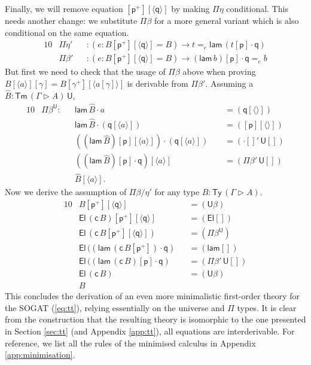 \documentclass[sigplan,10pt,anonymous,review]{acmart}\settopmatter{printfolios=true,printccs=false,printacmref=false}
\newcommand{\ra}{\rightarrow}
\newcommand{\Ty}{\mathsf{Ty}}
\newcommand{\Tm}{\mathsf{Tm}}
\newcommand{\p}{\mathsf{p}}
\newcommand{\q}{\mathsf{q}}
\newcommand{\ext}{\mathop{\triangleright}}
\newcommand{\lam}{\mathsf{lam}}
\newcommand{\U}{\mathsf{U}}
\newcommand{\El}{\mathsf{El}}
\newcommand{\cd}{\mathsf{c}}
\begin{document}
Finally, we will remove equation $[\p^+][\langle\q\rangle]$ by making
$\Pi\eta$ conditional. This needs another change: we substitute
$\Pi\beta$ for a more general variant which is also conditional on the
same equation.
\begin{alignat*}{10}
  & \Pi\eta' && : (e:B[\p^+][\langle\q\rangle] = B)\ra t =_e \lam\,(t[\p]\cdot\q) \\
  & \Pi\beta' && : (e:B[\p^+][\langle\q\rangle] = B)\ra (\lam\,b)[\p]\cdot\q =_e b
\end{alignat*}
But first we need to check that the usage of $\Pi\beta$ above when
proving $B[\langle a\rangle][\gamma] = B[\gamma^+][\langle
  a[\gamma]\rangle]$ is derivable from $\Pi\beta'$. Assuming a
$\hat{B} : \Tm\,(\Gamma\ext A)\,\U$,
\begin{alignat*}{10}
  & \Pi\beta^\U :{} &&  \lam\,\hat{B}\cdot a && {=}(\q[\langle\rangle]) \\
  & && \lam\,\hat{B}\cdot(\q[\langle a\rangle])\,\, && {=}([\p][\langle\rangle]) \\
  & && ((\lam\,\hat{B})[\p][\langle a\rangle])\cdot(\q[\langle a\rangle])\,\, && {=}(\cdot[]'\,\U[]) \\
  & && ((\lam\,\hat{B})[\p]\cdot\q)[\langle a\rangle] && {=}(\Pi\beta'\,\U[]) \\
  & && \hat{B}[\langle a\rangle].
\end{alignat*}
Now we derive the assumption of $\Pi\beta/\eta'$ for any type $B : \Ty\,(\Gamma\ext A)$.
\begin{alignat*}{10}
  & B[\p^+][\langle\q\rangle] && {=}(\U\beta) \\
  & \El\,(\cd\,B)[\p^+][\langle\q\rangle] && {=}(\El[]) \\
  & \El\,(\cd\,B[\p^+][\langle\q\rangle]) && {=}(\Pi\beta^\U) \\
  & \El\,((\lam\,(\cd\,B[\p^+])\cdot\q) && {=}(\lam[]) \\
  & \El\,((\lam\,(\cd\,B)[\p]\cdot\q) && {=}(\Pi\beta'\,\U[]) \\
  & \El\,(\cd\,B) && {=}(\U\beta) \\
  & B
\end{alignat*}
This concludes the derivation of an even more minimalistic first-order
theory for the SOGAT (\ref{eq:tt}), relying essentially on the
universe and $\Pi$ types. It is clear from the construction that the
resulting theory is isomorphic to the one presented in Section
\ref{sec:tt} (and Appendix \ref{app:tt}), all equations are
interderivable. For reference, we list all the rules of the minimised
calculus in Appendix \ref{app:minimisation}.
\end{document}
